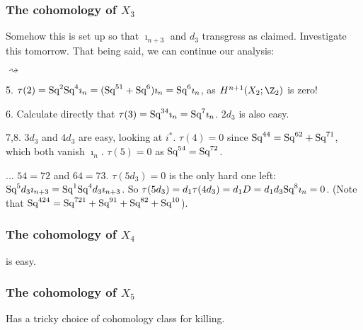 \documentclass[11pt]{article}
\newcommand{\Squ}{\textup{Sq}}
\theoremstyle{plain}
\theoremstyle{definition}
\newenvironment{itemise}{
\begin{list}{\textup{$\rightsquigarrow$}}
   {
      \setlength{\topsep}{.1cm}
      \setlength{\itemsep}{1pt}
      \setlength{\parskip}{0pt}
      \setlength{\parsep}{0pt}
   }
}{\end{list}\vspace{-.2cm}}
\begin{document}
\subsubsection{\texorpdfstring{The cohomology of $X_3$}{The cohomology of X3}}
Somehow this is set up so that $\imath_{n+3}$ and $d_3$ transgress as claimed.
Investigate this tomorrow. That being said, we can continue our analysis:
\begin{itemise}
\item[5.]$\tau(2)=\Squ^2\Squ^4\imath_n=(\Squ^{51}+\Squ^6)\imath_n=\Squ^6\imath_n$,
as $H^{n+1}(X_2;\Z_2)$ is zero!
\item[6.] %
Calculate directly that $\tau(3)=\Squ^{34}\imath_n=\Squ^7\imath_n$.
$2d_3$ is also easy.
\item[7,8.] $3d_3$ and $4d_3$ are easy, looking at $i^*$. $\tau(4)=0$ since $\Squ^{44}=\Squ^{62}+\Squ^{71}$, which both vanish 
$\imath_n$. $\tau(5)=0$ as $\Squ^{54}=\Squ^{72}$.
\item[...] $54=72$ and $64=73$. $\tau(5d_3)=0$ is the only hard one left:
$\Squ^5d_3\imath_{n+3}=\Squ^1\Squ^4d_3\imath_{n+3}$. So $\tau(5d_3)=d_1\tau(4d_3)
=d_1D=d_1d_3\Squ^8\imath_n=0$. (Note that $\Squ^{4 2 4} = \Squ^{7 2 1}
 + \Squ^{9 1} + \Squ^{8 2} + \Squ^{10}$).
\end{itemise}
\subsubsection{\texorpdfstring{The cohomology of $X_4$}{The cohomology of X4}}
is easy.
\subsubsection{\texorpdfstring{The cohomology of $X_5$}{The cohomology of X5}}
Has a tricky choice of cohomology class for killing.
\end{document}
